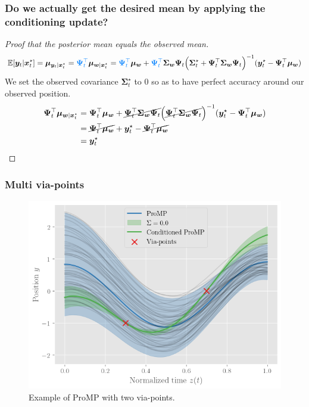 \documentclass{article}
\begin{document}
\subsubsection{Do we actually get the desired mean by applying the conditioning update?}

\begin{proof}[Proof that the posterior mean equals the observed mean]
\begin{equation}
  \E[\bm{y}_{t}|\bm{x}_{t}^{\star}] = \bm{\mu}_{\bm{y}_{t}|\bm{x}_{t}^{\star}} = \textcolor[rgb]{0,0.5,1}{\bm{\Psi}_t^\top} \bm{\mu}_{\bm{w}|\bm{x}_t^\star} = \textcolor[rgb]{0,0.5,1}{\bm{\Psi}_t^\top} \bm{\mu_w} + \textcolor[rgb]{0,0.5,1}{\bm{\Psi}_t^\top} \bm{\Sigma_w}\bm{\Psi}_t \Big(\bm{\Sigma}_t^\star + \bm{\Psi}_t^\top \bm{\Sigma_w}\bm{\Psi}_t \Big)^{-1} (\bm{y}_t^\star - \bm{\Psi}_t^\top \bm{\mu_w})
  \end{equation}
  We set the observed covariance $\bm{\Sigma}_t^\star$ to $0$ so as to have perfect accuracy around our observed position.
\begin{align}
  \bm{\Psi}_t^\top \bm{\mu}_{\bm{w}|\bm{x}_t^\star} &= \bm{\Psi}_t^\top \bm{\mu_w} + \cancel{\bm{\Psi}_t^\top \bm{\Sigma_w}\bm{\Psi}_t} \Big( \cancel{\bm{\Psi}_t^\top \bm{\Sigma_w}\bm{\Psi}_t} \Big)^{-1} (\bm{y}_t^\star - \bm{\Psi}_t^\top \bm{\mu_w})\\
                                   &= \cancel{\bm{\Psi}_t^\top \bm{\mu_w}} + \bm{y}_t^\star - \cancel{\bm{\Psi}_t^\top \bm{\mu_w}}\\
                                   &= \bm{y}_t^\star
  \end{align}
  \end{proof}

  \subsubsection{Multi via-points}

\begin{figure}[htbp]
  \centering
  \includegraphics[width=0.5\linewidth]{fig/2-via-points.png}
  \caption{Example of ProMP with two via-points.}
  \label{fig:multi-via-pts}
\end{figure}
\end{document}
